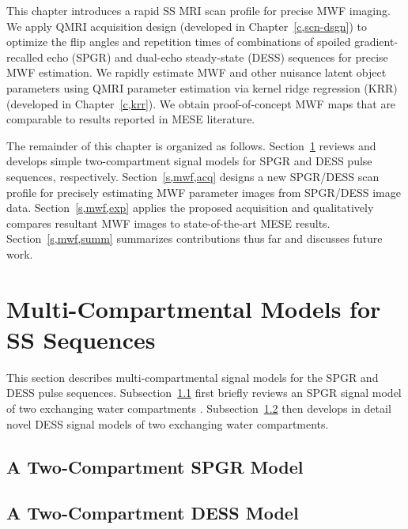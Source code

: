 This chapter introduces
a rapid SS MRI scan profile
for precise MWF imaging.
We apply QMRI acquisition design
(developed in Chapter~\ref{c,scn-dsgn})
to optimize the flip angles and repetition times
of combinations 
of spoiled gradient-recalled echo (SPGR)
\cite{zur:91:sot}
and dual-echo steady-state (DESS) 
\cite{redpath:88:fan, bruder:88:ans} sequences
for precise MWF estimation.
We rapidly estimate MWF and 
other nuisance latent object parameters
using QMRI parameter estimation
via kernel ridge regression (KRR)
(developed in Chapter~\ref{c,krr}).
We obtain proof-of-concept MWF maps \invivo
that are comparable
to results reported
in MESE literature.

The remainder of this chapter
is organized as follows.
Section~\ref{s,mwf,model} reviews and develops
simple two-compartment signal models
for SPGR and DESS pulse sequences, 
respectively.
Section~\ref{s,mwf,acq} designs 
a new SPGR/DESS scan profile 
for precisely estimating MWF parameter images
from SPGR/DESS image data.
Section~\ref{s,mwf,exp} applies
the proposed acquisition \invivo
and qualitatively compares resultant MWF images
to state-of-the-art MESE results.
Section~\ref{s,mwf,summ} summarizes contributions thus far
and discusses future work. 

\section{Multi-Compartmental Models for SS Sequences}
\label{s,mwf,model}

This section describes multi-compartmental signal models
for the SPGR and DESS pulse sequences.
Subsection~\ref{ss,mwf,model,spgr} first briefly reviews
an SPGR signal model 
of two exchanging water compartments \cite{deoni:08:gmt}.
Subsection~\ref{ss,mwf,model,dess} then develops 
in detail novel DESS signal models 
of two exchanging water compartments.

\subsection{A Two-Compartment SPGR Model}
\label{ss,mwf,model,spgr}


\subsection{A Two-Compartment DESS Model}
\label{ss,mwf,model,dess}

